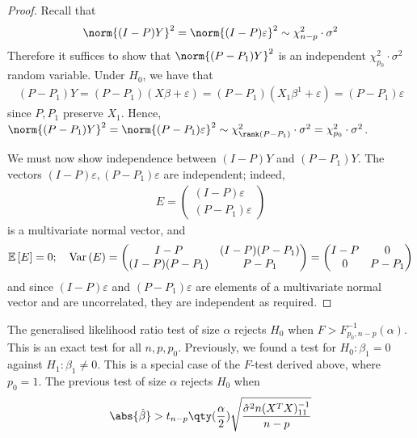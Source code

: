 \begin{proof}
	Recall that
	\begin{align*}
		\norm{(I-P)Y}^2 = \norm{(I-P)\varepsilon}^2 \sim \chi^2_{n-p} \cdot \sigma^2
	\end{align*}
	Therefore it suffices to show that $\norm{(P-P_1)Y}^2$ is an independent $\chi^2_{p_0} \cdot \sigma^2$ random variable.
	Under $H_0$, we have that
	\begin{align*}
		(P-P_1)Y = (P-P_1)(X\beta+\varepsilon) = (P-P_1)(X_1 \beta^1 + \varepsilon) = (P-P_1)\varepsilon
	\end{align*}
	since $P, P_1$ preserve $X_1$.
	Hence, $\norm{(P-P_1)Y}^2 = \norm{(P-P_1)\varepsilon}^2 \sim \chi^2_{\rank (P-P_1)} \cdot \sigma^2 = \chi^2_{p_0} \cdot \sigma^2$.

	We must now show independence between $(I-P)Y$ and $(P-P_1)Y$.
	The vectors $(I-P)\varepsilon, (P-P_1)\varepsilon$ are independent; indeed,
	\begin{align*}
		E = \begin{pmatrix}
			(I-P)\varepsilon \\
			(P-P_1)\varepsilon
		\end{pmatrix}
	\end{align*}
	is a multivariate normal vector, and
	\begin{align*}
		\mathbb{E}\left[{E}\right] = 0;\quad \operatorname{Var}\left({E}\right) = \begin{pmatrix}
			I-P          & (I-P)(P-P_1) \\
			(I-P)(P-P_1) & P-P_1
		\end{pmatrix} = \begin{pmatrix}
			I-P & 0     \\
			0   & P-P_1
		\end{pmatrix}
	\end{align*}
	and since $(I-P)\varepsilon$ and $(P-P_1)\varepsilon$ are elements of a multivariate normal vector and are uncorrelated, they are independent as required.
\end{proof}

The generalised likelihood ratio test of size $\alpha$ rejects $H_0$ when $F > F^{-1}_{p_0,n-p}(\alpha)$.
This is an exact test for all $n, p, p_0$.
Previously, we found a test for $H_0\colon \beta_1 = 0$ against $H_1 \colon \beta_1 \neq 0$.
This is a special case of the $F$-test derived above, where $p_0 = 1$.
The previous test of size $\alpha$ rejects $H_0$ when
\begin{align*}
	\abs{\hat\beta} > t_{n-p}\qty(\frac{\alpha}{2}) \sqrt{\frac{\hat\sigma^2 n (X^\tran X)^{-1}_{11}}{n-p}}
\end{align*}

